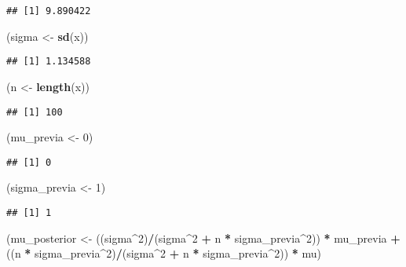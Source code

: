 \documentclass[
  12pt,
]{book}
\newenvironment{Shaded}{\begin{snugshade}}{\end{snugshade}}
\newcommand{\DecValTok}[1]{\textcolor[rgb]{0.00,0.00,0.81}{#1}}
\newcommand{\KeywordTok}[1]{\textcolor[rgb]{0.13,0.29,0.53}{\textbf{#1}}}
\newcommand{\NormalTok}[1]{#1}
\newcommand{\OperatorTok}[1]{\textcolor[rgb]{0.81,0.36,0.00}{\textbf{#1}}}
\newcommand{\StringTok}[1]{\textcolor[rgb]{0.31,0.60,0.02}{#1}}
\begin{document}
\begin{verbatim}
## [1] 9.890422
\end{verbatim}

\begin{Shaded}
\begin{Highlighting}[]
\NormalTok{(sigma \textless{}{-}}\StringTok{ }\KeywordTok{sd}\NormalTok{(x))}
\end{Highlighting}
\end{Shaded}

\begin{verbatim}
## [1] 1.134588
\end{verbatim}

\begin{Shaded}
\begin{Highlighting}[]
\NormalTok{(n \textless{}{-}}\StringTok{ }\KeywordTok{length}\NormalTok{(x))}
\end{Highlighting}
\end{Shaded}

\begin{verbatim}
## [1] 100
\end{verbatim}

\begin{Shaded}
\begin{Highlighting}[]
\NormalTok{(mu\_previa \textless{}{-}}\StringTok{ }\DecValTok{0}\NormalTok{)}
\end{Highlighting}
\end{Shaded}

\begin{verbatim}
## [1] 0
\end{verbatim}

\begin{Shaded}
\begin{Highlighting}[]
\NormalTok{(sigma\_previa \textless{}{-}}\StringTok{ }\DecValTok{1}\NormalTok{)}
\end{Highlighting}
\end{Shaded}

\begin{verbatim}
## [1] 1
\end{verbatim}

\begin{Shaded}
\begin{Highlighting}[]
\NormalTok{(mu\_posterior \textless{}{-}}\StringTok{ }\NormalTok{((sigma}\OperatorTok{\^{}}\DecValTok{2}\NormalTok{)}\OperatorTok{/}\NormalTok{(sigma}\OperatorTok{\^{}}\DecValTok{2} \OperatorTok{+}\StringTok{ }\NormalTok{n }\OperatorTok{*}\StringTok{ }\NormalTok{sigma\_previa}\OperatorTok{\^{}}\DecValTok{2}\NormalTok{)) }\OperatorTok{*}\StringTok{ }
\StringTok{    }\NormalTok{mu\_previa }\OperatorTok{+}\StringTok{ }\NormalTok{((n }\OperatorTok{*}\StringTok{ }\NormalTok{sigma\_previa}\OperatorTok{\^{}}\DecValTok{2}\NormalTok{)}\OperatorTok{/}\NormalTok{(sigma}\OperatorTok{\^{}}\DecValTok{2} \OperatorTok{+}\StringTok{ }\NormalTok{n }\OperatorTok{*}\StringTok{ }
\StringTok{    }\NormalTok{sigma\_previa}\OperatorTok{\^{}}\DecValTok{2}\NormalTok{)) }\OperatorTok{*}\StringTok{ }\NormalTok{mu)}
\end{Highlighting}
\end{Shaded}
\end{document}
